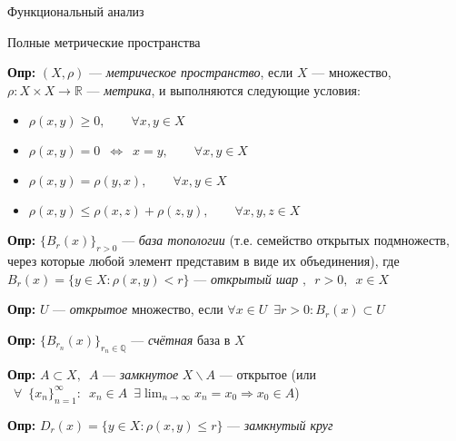 \documentclass[12pt, letterpaper, twoside]{article}
\begin{document}
 
\begin{center}
    {\LARGE Функциональный анализ}
    \vspace*{1.5cm}
    
    {\Large Полные метрические пространства}
\end{center}

\noindent
\textbf{Опр:} \((X, \rho)\) --- \textit{метрическое пространство}, если \(X\) --- множество,\\
\(\rho: X \times X \rightarrow \mathbb{R}\) --- \textit{метрика}, и выполняются следующие условия:
\begin{itemize}
    \item \(\rho(x, y) \geq 0, \qquad  \forall x, y \in X\)
    \item \(\rho(x, y) = 0 \enspace \Leftrightarrow \enspace x = y, \qquad  \forall x, y \in X\)
    \item \(\rho(x, y) = \rho(y, x), \qquad  \forall x, y \in X\)
    \item \(\rho(x, y) \leq \rho(x, z) + \rho(z, y), \qquad  \forall x, y, z \in X\)
\end{itemize} 

\vspace*{0.3cm}
\noindent
\textbf{Опр:} \(\{B_r(x)\}_{r>0}\) --- \textit{база топологии} (т.е. семейство открытых подмножеств, через которые любой элемент представим в виде их объединения), где \(B_r(x) = \{y \in X : \rho(x, y) < r\}\) --- \textit{открытый шар} \(,\enspace r > 0, \enspace x \in X\)
  
\vspace*{0.3cm}
\noindent
\textbf{Опр:} \(U\) --- \textit{открытое} множество, если \(\forall x \in U \enspace \exists r > 0: B_r(x) \subset U\)

\vspace*{0.3cm}
\noindent
\textbf{Опр:} \(\{B_{r_n} (x)\}_{r_n \in \mathbb{Q}}\) --- \textit{счётная} база в \(X\)

\vspace*{0.3cm}
\noindent
\textbf{Опр:} \(A \subset X, \enspace A\) --- \textit{замкнутое} \enspace \Leftrightarrow \enspace \(X \smallsetminus A\) --- открытое (или \(\enspace \forall \enspace \{x_n\}^\infty _{n = 1} : \enspace x_n \in A \enspace \exists \lim_{n \rightarrow \infty} x_n = x_0 \Rightarrow x_0 \in A\))

\vspace*{0.3cm}
\noindent
\textbf{Опр:} \(D_r(x) = \{y \in X: \rho (x, y) \leq r \}\) --- \textit{замкнутый круг}
    
\end{document}
